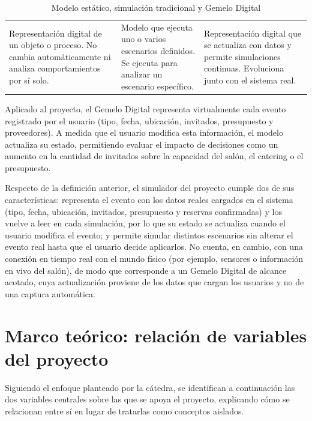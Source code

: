 \begin{table}[H]
    \centering
    \caption{Modelo estático, simulación tradicional y Gemelo Digital}
    \label{tab:gemelo-digital-comparacion}
    \small
    \begin{tabularx}{\textwidth}{L L L}
        \toprule
         &  &  \\
        \midrule
        Representación digital de un objeto o proceso. No cambia
        automáticamente ni analiza comportamientos por sí solo. &
        Modelo que ejecuta uno o varios escenarios definidos. Se ejecuta
        para analizar un escenario específico. &
        Representación digital que se actualiza con datos y permite
        simulaciones continuas. Evoluciona junto con el sistema real. \\
        \bottomrule
    \end{tabularx}
\end{table}

Aplicado al proyecto, el Gemelo Digital representa virtualmente cada
evento registrado por el usuario (tipo, fecha, ubicación, invitados,
presupuesto y proveedores). A medida que el usuario modifica esta
información, el modelo actualiza su estado, permitiendo evaluar el
impacto de decisiones como un aumento en la cantidad de invitados sobre
la capacidad del salón, el catering o el presupuesto.

Respecto de la definición anterior, el simulador del proyecto cumple
dos de sus características: representa el evento con los datos reales
cargados en el sistema (tipo, fecha, ubicación, invitados, presupuesto y
reservas confirmadas) y los vuelve a leer en cada simulación, por lo que
su estado se actualiza cuando el usuario modifica el evento; y permite
simular distintos escenarios sin alterar el evento real hasta que el
usuario decide aplicarlos. No cuenta, en cambio, con una conexión en
tiempo real con el mundo físico (por ejemplo, sensores o información en
vivo del salón), de modo que corresponde a un Gemelo Digital de alcance
acotado, cuya actualización proviene de los datos que cargan los
usuarios y no de una captura automática.

\section{Marco teórico: relación de variables del proyecto}\label{sec:marco-variables}

Siguiendo el enfoque planteado por la cátedra, se identifican a
continuación las dos variables centrales sobre las que se apoya el
proyecto, explicando cómo se relacionan entre sí en lugar de tratarlas
como conceptos aislados.

